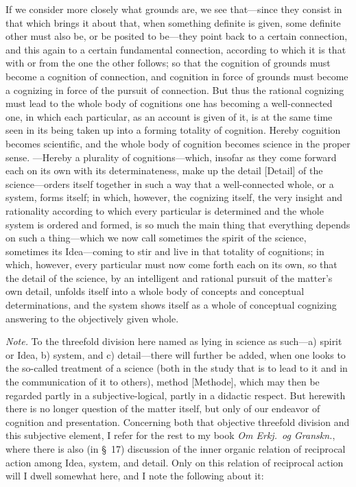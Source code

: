 \documentclass[12pt,a4paper]{book}
\begin{document}
If we consider more closely what grounds are, we see that---since they consist in
that which brings it about that, when something definite is given, some definite
other must also be, or be posited to be---they point back to a certain connection,
and this again to a certain fundamental connection, according to which it is that
with or from the one the other follows; so that the cognition of grounds must
become a cognition of connection, and cognition in force of grounds must become a
cognizing in force of the pursuit of connection. But thus the rational cognizing
must lead to the whole body of cognitions one has becoming a well-connected one,
in which each particular, as an account is given of it, is at the same time seen
in its being taken up into a forming totality of cognition. Hereby cognition
becomes scientific, and the whole body of cognition becomes science in the proper
sense. ---Hereby a plurality of cognitions---which, insofar as they come forward
each on its own with its determinateness, make up the detail [Detail] of the
science---orders itself together in such a way that a well-connected whole, or a
system, forms itself; in which, however, the cognizing itself, the very insight
and rationality according to which every particular is determined and the whole
system is ordered and formed, is so much the main thing that everything depends on
such a thing---which we now call sometimes the spirit of the science, sometimes
its Idea---coming to stir and live in that totality of cognitions; in which,
however, every particular must now come forth each on its own, so that the detail
of the science, by an intelligent and rational pursuit of the matter's own detail,
unfolds itself into a whole body of concepts and conceptual determinations, and
the system shows itself as a whole of conceptual cognizing answering to the
objectively given whole.

{\small\emph{Note.} To the threefold division here named as lying in science as
such---a) spirit or Idea, b) system, and c) detail---there will further be added,
when one looks to the so-called treatment of a science (both in the study that is
to lead to it and in the communication of it to others), method [Methode], which
may then be regarded partly in a subjective-logical, partly in a didactic respect.
But herewith there is no longer question of the matter itself, but only of our
endeavor of cognition and presentation. Concerning both that objective threefold
division and this subjective element, I refer for the rest to my book
\textit{Om Erkj.\ og Granskn.}, where there is also (in \S~17) discussion of the
inner organic relation of reciprocal action among Idea, system, and detail. Only
on this relation of reciprocal action will I dwell somewhat here, and I note the
following about it:\par}
\end{document}
